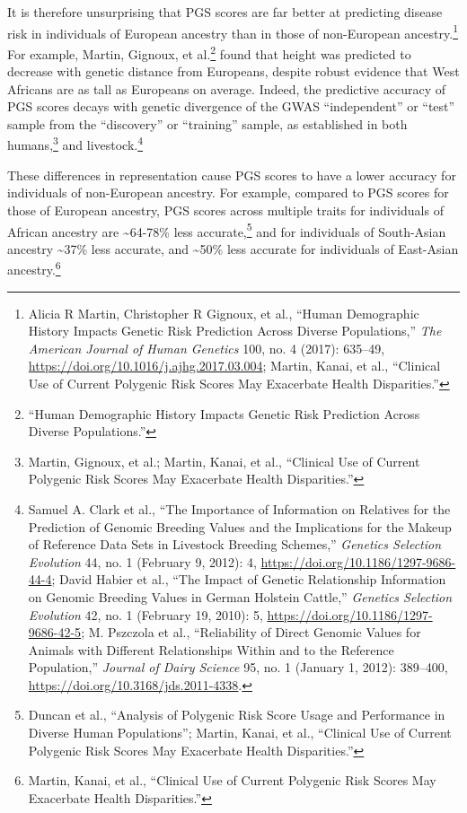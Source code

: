 \documentclass[
]{book}
\begin{document}
It is therefore unsurprising that PGS scores are far better at predicting disease risk in individuals of European ancestry than in those of non-European ancestry.\footnote{Alicia R Martin, Christopher R Gignoux, et al., {``Human Demographic History Impacts Genetic Risk Prediction Across Diverse Populations,''} \emph{The American Journal of Human Genetics} 100, no. 4 (2017): 635--49, \url{https://doi.org/10.1016/j.ajhg.2017.03.004}; Martin, Kanai, et al., {``Clinical Use of Current Polygenic Risk Scores May Exacerbate Health Disparities.''}} For example, Martin, Gignoux, et al.\footnote{{``Human Demographic History Impacts Genetic Risk Prediction Across Diverse Populations.''}} found that height was predicted to decrease with genetic distance from Europeans, despite robust evidence that West Africans are as tall as Europeans on average. Indeed, the predictive accuracy of PGS scores decays with genetic divergence of the GWAS ``independent'' or ``test'' sample from the ``discovery'' or ``training'' sample, as established in both humans,\footnote{Martin, Gignoux, et al.; Martin, Kanai, et al., {``Clinical Use of Current Polygenic Risk Scores May Exacerbate Health Disparities.''}} and livestock.\footnote{Samuel A. Clark et al., {``The Importance of Information on Relatives for the Prediction of Genomic Breeding Values and the Implications for the Makeup of Reference Data Sets in Livestock Breeding Schemes,''} \emph{Genetics Selection Evolution} 44, no. 1 (February 9, 2012): 4, \url{https://doi.org/10.1186/1297-9686-44-4}; David Habier et al., {``The Impact of Genetic Relationship Information on Genomic Breeding Values in {German Holstein} Cattle,''} \emph{Genetics Selection Evolution} 42, no. 1 (February 19, 2010): 5, \url{https://doi.org/10.1186/1297-9686-42-5}; M. Pszczola et al., {``Reliability of Direct Genomic Values for Animals with Different Relationships Within and to the Reference Population,''} \emph{Journal of Dairy Science} 95, no. 1 (January 1, 2012): 389--400, \url{https://doi.org/10.3168/jds.2011-4338}.}

These differences in representation cause PGS scores to have a lower accuracy for individuals of non-European ancestry. For example, compared to PGS scores for those of European ancestry, PGS scores across multiple traits for individuals of African ancestry are \textasciitilde64-78\% less accurate,\footnote{Duncan et al., {``Analysis of Polygenic Risk Score Usage and Performance in Diverse Human Populations''}; Martin, Kanai, et al., {``Clinical Use of Current Polygenic Risk Scores May Exacerbate Health Disparities.''}} and for individuals of South-Asian ancestry \textasciitilde37\% less accurate, and \textasciitilde50\% less accurate for individuals of East-Asian ancestry.\footnote{Martin, Kanai, et al., {``Clinical Use of Current Polygenic Risk Scores May Exacerbate Health Disparities.''}}
\end{document}
